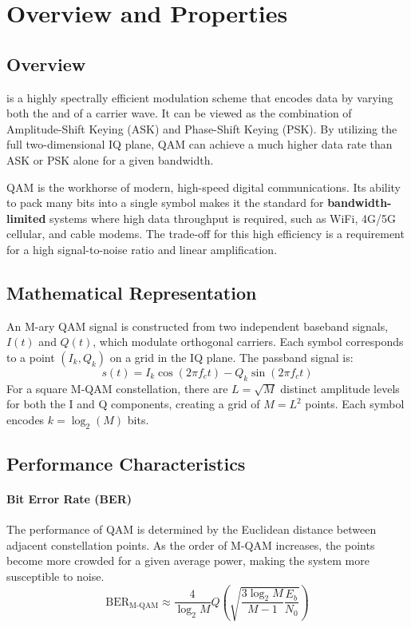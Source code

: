 \section{Overview and Properties}

\subsection{Overview}

 is a highly spectrally efficient modulation scheme that encodes data by varying both the  and  of a carrier wave. It can be viewed as the combination of Amplitude-Shift Keying (ASK) and Phase-Shift Keying (PSK). By utilizing the full two-dimensional IQ plane, QAM can achieve a much higher data rate than ASK or PSK alone for a given bandwidth.

\begin{keyconcept}
    QAM is the workhorse of modern, high-speed digital communications. Its ability to pack many bits into a single symbol makes it the standard for \textbf{bandwidth-limited} systems where high data throughput is required, such as WiFi, 4G/5G cellular, and cable modems. The trade-off for this high efficiency is a requirement for a high signal-to-noise ratio and linear amplification.
\end{keyconcept}


\subsection{Mathematical Representation}

An M-ary QAM signal is constructed from two independent baseband signals, $I(t)$ and $Q(t)$, which modulate orthogonal carriers. Each symbol corresponds to a point $(I_k, Q_k)$ on a grid in the IQ plane. The passband signal is:
\begin{equation}
    s(t) = I_k \cos(2\pi f_c t) - Q_k \sin(2\pi f_c t)
\end{equation}
For a square M-QAM constellation, there are $L = \sqrt{M}$ distinct amplitude levels for both the I and Q components, creating a grid of $M=L^2$ points. Each symbol encodes $k = \log_2(M)$ bits.


\subsection{Performance Characteristics}

\paragraph{Bit Error Rate (BER)}
The performance of QAM is determined by the Euclidean distance between adjacent constellation points. As the order of M-QAM increases, the points become more crowded for a given average power, making the system more susceptible to noise.
\begin{equation}
    \text{BER}_{\text{M-QAM}} \approx \frac{4}{\log_2 M} Q\left(\sqrt{\frac{3\log_2 M}{M-1} \frac{E_b}{N_0}}\right)
\end{equation}

